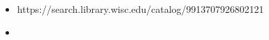 \begin{itemize}
    \item https://search.library.wisc.edu/catalog/9913707926802121
    \item 
\end{itemize}